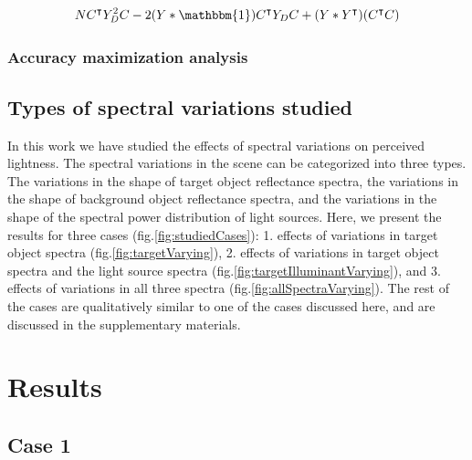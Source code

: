 \documentclass{jov}
\begin{document}
\begin{align}
N C^\intercal Y_D^2 C - 2(Y*\mathbbm{1})C^\intercal Y_D C + (Y*Y^\intercal) (C^\intercal C)
\end{align} 



\subsubsection*{Accuracy maximization analysis}

\subsection{Types of spectral variations studied}
In this work we have studied the effects of spectral variations on perceived lightness. The spectral variations in the scene can be categorized into three types. The variations in the shape of target object reflectance spectra, the variations in the shape of background object reflectance spectra, and the variations in the shape of the spectral power distribution of light sources. Here, we present the results for three cases (fig.\ref{fig:studiedCases}): 1. effects of variations in target object spectra (fig.\ref{fig:targetVarying}), 2. effects of variations in target object spectra and the light source spectra (fig.\ref{fig:targetIlluminantVarying}), and 3. effects of variations in all three spectra (fig.\ref{fig:allSpectraVarying}). The rest of the cases are qualitatively similar to one of the cases discussed here, and are discussed in the supplementary materials. 


\section{Results}
\subsection{Case 1}
\end{document}
